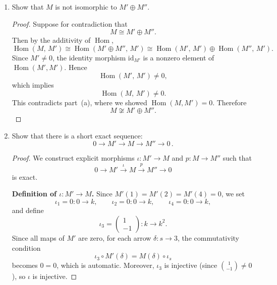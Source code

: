\documentclass[11pt, a4paper]{article}
\begin{document}
\begin{enumerate}[leftmargin=*, label=\textbf{\arabic*.}]
\begin{enumerate}[label=(\alph*)]
\begin{proof}
    At $\gamma\colon 4\to 3$:
    \[
    M(\gamma)\circ f_4 = f_3\circ M''(\gamma) \quad\Longrightarrow\quad \begin{pmatrix}1\\1\end{pmatrix}e = \begin{pmatrix}a\\0\end{pmatrix} = \begin{pmatrix}0\\0\end{pmatrix} \quad\Longrightarrow\quad e = 0.
    \]
    
    All components vanish, so $\operatorname{Hom}(M'',M) = 0$.
    \end{proof}
    \item Show that $M$ is not isomorphic to $M' \oplus M''$.
    \begin{proof}
    Suppose for contradiction that
    \[
    M \cong M' \oplus M''.
    \]
    Then by the additivity of $\operatorname{Hom}$,
    \[
    \operatorname{Hom}(M,\,M') \cong \operatorname{Hom}(M'\oplus M'',\, M') \cong \operatorname{Hom}(M',\,M') \oplus \operatorname{Hom}(M'',\,M').
    \]
    Since $M'\neq 0$, the identity morphism $\mathrm{id}_{M'}$ is a nonzero element of $\operatorname{Hom}(M',M')$. Hence
    \[
    \operatorname{Hom}(M',\,M') \neq 0,
    \]
    which implies
    \[
    \operatorname{Hom}(M,\,M') \neq 0.
    \]
    This contradicts part~(a), where we showed $\operatorname{Hom}(M,M')=0$. Therefore
    \[
    M \not\cong M' \oplus M''.
    \]
    \end{proof}
    \item Show that there is a short exact sequence:
    \[
        0 \longrightarrow M' \longrightarrow M \longrightarrow M'' \longrightarrow 0\,.
    \]
    \begin{proof}
    We construct explicit morphisms $\iota\colon M'\to M$ and $p\colon M\to M''$ such that
    \[
    0 \longrightarrow M' \xrightarrow{\;\iota\;} M \xrightarrow{\;p\;} M'' \longrightarrow 0
    \]
    is exact.
    
    \medskip\noindent\textbf{Definition of $\iota\colon M'\to M$.}
    Since $M'(1)=M'(2)=M'(4)=0$, we set
    \[
    \iota_1 = 0\colon 0\to k,\qquad \iota_2 = 0\colon 0\to k,\qquad \iota_4 = 0\colon 0\to k,
    \]
    and define
    \[
    \iota_3 = \begin{pmatrix}1\\-1\end{pmatrix}\colon k\to k^2.
    \]
    Since all maps of $M'$ are zero, for each arrow $\delta\colon s\to 3$, the commutativity condition
    \[
    \iota_3 \circ M'(\delta) = M(\delta)\circ \iota_s
    \]
    becomes $0 = 0$, which is automatic. Moreover, $\iota_3$ is injective (since $\binom{1}{-1}\neq 0$), so $\iota$ is injective.
    

\end{proof}
\end{enumerate}
\end{enumerate}
\end{document}
